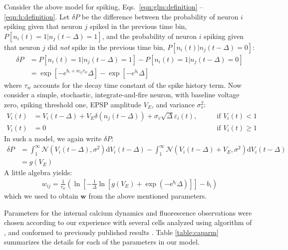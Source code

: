 \documentclass[aoas,preprint]{imsart}
\newcommand{\w}{w}
\newcommand{\bw}{\mathbf{\w}}
\begin{document}
Consider the above model for spiking, Eqs.~\eqref{eqn:glm:definition} -- \eqref{eqn:h:definition}.  Let $\delta P$ be the difference between the probability of neuron $i$ spiking given that neuron $j$ spiked in the previous time bin, $P[n_i(t)=1 | n_j(t-\Delta)=1]$, and the probability of neuron $i$ spiking given that neuron $j$ did \emph{not} spike in the previous time bin, $P[n_i(t) | n_j(t-\Delta)=0]$:
\begin{align}\label{eqn:convert:leadin-2}
\delta P &= P[n_i(t)=1 | n_j(t-\Delta)=1] - P[n_i(t)=1 | n_j(t-\Delta)=0] \nonumber
\\ &= \exp[-e^{b_i+w_{ij}\tau_w}\Delta]-\exp[-e^{b_i}\Delta]
\end{align}
\noindent where $\tau_w$ accounts for the decay time constant of the spike history term.   Now consider a simple, stochastic, integrate-and-fire neuron, with baseline voltage zero, spiking threshold one, EPSP amplitude $V_E$, and variance $\sigma_v^2$:
\begin{align}
	V_i(t) &= V_i(t-\Delta) + V_E \delta(n_j(t-\Delta)) + \sigma_v \sqrt{\Delta} \varepsilon_i(t), \qquad &\text{if } V_i(t)<1 \nonumber
\\	V_i(t) &= 0 &\text{if } V_i(t)\geq 1 
\end{align}
In such a model, we again write $\delta P$:
\begin{align}\label{eqn:convert:leadin-3}
\delta P &= \int_1^\infty \mathcal{N}(V_i(t-\Delta),\sigma^2) \text{d}V_i(t-\Delta) - \int_1^\infty \mathcal{N}(V_i(t-\Delta)+V_E,\sigma^2)\text{d}V_i(t-\Delta) \nonumber
\\ &=g(V_E)
\end{align}
A little algebra yields:
\begin{align}
	w_{ij}= \frac{1}{\tau_w}\left(\ln \left[ -\frac{1}{\Delta} \ln \left[g(V_E)+ \exp\left(-\text{e}^{b_i}\Delta\right)\right]\right]-b_i\right)
\end{align}
which we used to obtain $\bw$ from the above mentioned parameters. 


Parameters for the internal calcium dynamics and fluorescence observations were chosen according to our experience with several cells analyzed using algorithm of \cite{Vogelstein2009}, and conformed to previously published results \cite{ImagingManual,HelmchenSakmann96,BrenowitzRegehr07}. %
Table \ref{table:caparm} summarizes the details for each of the parameters in our model.
\end{document}

